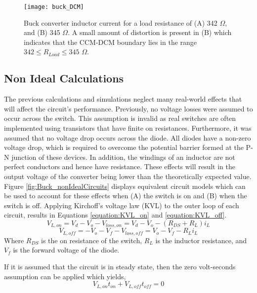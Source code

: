 \documentclass[12pt,twoside]{scrartcl}
\begin{document}
\begin{figure}[h]
    \centering
    \texttt{[image: buck\_DCM]}
    \caption{Buck converter inductor current for a load resistance of (A) 342 $\Omega$, and (B) 345 $\Omega$. A small amount of distortion is present in (B) which indicates that the CCM-DCM boundary lies in the range $342 \le R_{Load} \le 345$ $\Omega$.}
    \label{fig:buck_DCM}
\end{figure}
\newpage

\subsection{Non Ideal Calculations}
The previous calculations and simulations neglect many real-world effects that will affect the circuit's performance. Previously, no voltage losses were assumed to occur across the switch. This assumption is invalid as real switches are often implemented using transistors that have finite on resistances. Furthermore, it was assumed that no voltage drop occurs across the diode. All diodes have a non-zero voltage drop, which is required to overcome the potential barrier formed at the P-N junction of these devices. In addition, the windings of an inductor are not perfect conductors and hence have resistance. These effects will result in the output voltage of the converter being lower than the theoretically expected value. Figure \ref{fig:Buck_nonIdealCircuits} displays equivalent circuit models which can be used to account for these effects when (A) the switch is on and (B) when the switch is off. Applying Kirchoff’s voltage law (KVL) to the outer loop of each circuit, results in Equations \ref{equation:KVL_on} and \ref{equation:KVL_off}.
\begin{equation}
V_{L,on} = V_{d} - V_{o} - V_{loss, on} = V_{d} - V_{o} - (R_{DS}+ R_{L})i_{L} \label{equation:KVL_on}
\end{equation}
\begin{equation}
V_{L,off} = -V_{o} - V_{f} - V_{loss, off} = V_{o} - V_{f} - R_{L}i_{L}\label{equation:KVL_off}
\end{equation}
Where $R_{DS}$ is the on resistance of the switch, $R_{L}$ is the inductor resistance, and $V_{f}$ is the forward voltage of the diode.\par
\vspace{5mm}
\noindent If it is assumed that the circuit is in steady state, then the zero volt-seconds assumption can be applied which yields,
\begin{equation*}
V_{L,on}t_{on} + V_{L,off}t_{off} = 0
\end{equation*}
\end{document}
